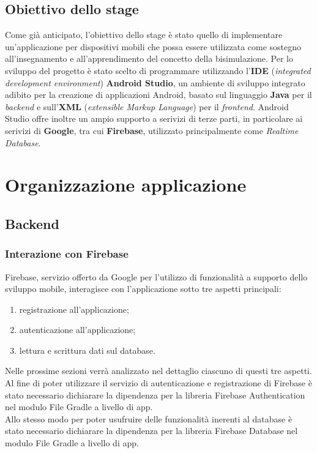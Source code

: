 \documentclass[a4paper,11pt,twoside,openright]{report}
\begin{document}
\section{Obiettivo dello stage}
Come già anticipato, l'obiettivo dello stage è stato quello di implementare un'applicazione per dispositivi mobili che possa essere utilizzata come sostegno all'insegnamento e all'apprendimento del concetto della bisimulazione. Per lo sviluppo del progetto è stato scelto di programmare utilizzando l'\textbf{IDE} (\textit{integrated development environment})  \textbf{Android Studio}, un ambiente di sviluppo integrato adibito per la creazione di applicazioni Android, basato sul linguaggio \textbf{Java} per il \textit{backend} e sull'\textbf{XML} (\textit{extensible Markup Language}) per il \textit{frontend}. Android Studio offre inoltre un ampio supporto a serivizi di terze parti, in particolare ai serivizi di \textbf{Google}, tra cui \textbf{Firebase}, utilizzato principalmente come \textit{Realtime Database}.

\chapter{Organizzazione applicazione}
\section{Backend}
\subsection{Interazione con Firebase}
Firebase, servizio offerto da Google per l'utilizzo di funzionalità a supporto dello sviluppo mobile, interagisce con l'applicazione sotto tre aspetti principali:

\begin{enumerate}
\item registrazione all'applicazione;

\item autenticazione all'applicazione;

\item lettura e scrittura dati sul database.
\end{enumerate}

Nelle prossime sezioni verrà analizzato nel dettaglio ciascuno di questi tre aspetti.\\
Al fine di poter utilizzare il servizio di autenticazione e registrazione di Firebase è stato necessario dichiarare la dipendenza per la libreria Firebase Authentication nel modulo File Gradle a livello di app.\\
Allo stesso modo per poter usufruire delle funzionalità inerenti al database è stato necessario dichiarare la dipendenza per la libreria Firebase Database nel modulo File Gradle a livello di app.
\end{document}
